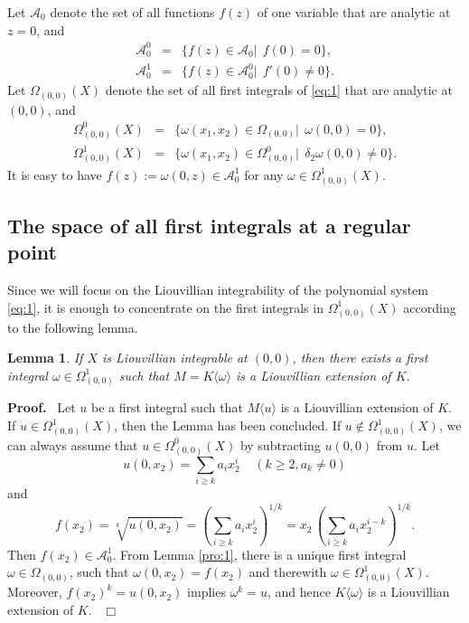\documentclass[preprint, 12pt]{elsarticle}
\newtheorem{lem}[thm]{Lemma}
\numberwithin{equation}{section}
\newenvironment{proof}[1][Proof]{\textbf{#1.}\ }{\ $\Box$}
\newcommand{\A}{\mathcal{A}}
\begin{document}
Let $\A_0$ denote the set of all functions $f(z)$ of
one variable that are analytic at $z = 0$, and
\begin{eqnarray*}
\A_0^0 &=& \{f(z)\in \A_0|\ \ f(0) = 0\},\\
\A_0^1 &=& \{f(z)\in \A_0^0|\ \ f'(0)\not=0\}.
\end{eqnarray*}
Let $\Omega_{(0,0)}(X)$ denote the set of all first integrals of
\eqref{eq:1} that are analytic at $(0,0)$, and
\begin{eqnarray*}
\Omega_{(0,0)}^0(X) &=& \{\omega(x_1,x_2)\in \Omega_{(0,0)}|\ \
\omega(0,0) = 0\},\\
\Omega_{(0,0)}^1(X) &=& \{\omega(x_1,x_2)\in\Omega_{(0,0)}^0|\ \
\delta_2\omega(0,0)\not=0\}.
\end{eqnarray*}
It is easy to have $f(z) := \omega(0,z)\in \A_0^1$ for any $\omega \in
\Omega_{(0,0)}^1(X)$.


\subsection{The space of all first integrals at a regular point}
\label{sec:1.1} 
Since we will focus on the Liouvillian
integrability of the polynomial system \eqref{eq:1}, it is enough
to concentrate on the first integrals in $\Omega_{(0,0)}^1(X)$ according to the following lemma.
\begin{lem}
\label{pro:2} 
If $X$ is Liouvillian integrable at $(0,0)$, then
there exists a first integral $\omega\in \Omega_{(0,0)}^1$ such
that $M = K\langle \omega\rangle$ is a Liouvillian extension of
$K$.
\end{lem}
\begin{proof}
Let $u$ be a first integral such that $M\langle u\rangle$ is a
Liouvillian extension of $K$. If $u\in \Omega_{(0,0)}^1(X)$, then
the Lemma has been concluded. If
$u\not\in\Omega_{(0,0)}^1(X)$, we can always assume that
$u\in\Omega_{(0,0)}^0(X)$ by subtracting $u(0,0)$ from $u$. Let
$$u(0,x_2) = \sum_{i\geq k} a_i x_2^i \ \ \ \ \ (k\geq 2, a_k\not=0)$$
and
$$f(x_2) = \sqrt[k]{u(0,x_2)} = \left(\sum_{i\geq k} a_i x_2^i\right)^{1/k} = x_2\,\left(\sum_{i\geq k}a_i x_2^{i-k}\right)^{1/k}.$$
Then $f(x_2)\in \A_0^1$. From Lemma \ref{pro:1}, there is a
unique first integral $\omega\in \Omega_{(0,0)}$, such that
$\omega(0, x_2) = f(x_2)$ and therewith $\omega\in
\Omega_{(0,0)}^1(X)$. Moreover, $f(x_2)^k = u(0,
x_2)$ implies $\omega^k = u$, and hence $K\langle \omega\rangle$ is a
Liouvillian extension of $K$.
\end{proof}
\end{document}
